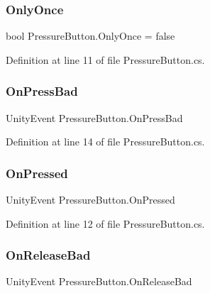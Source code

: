 \subsubsection{\texorpdfstring{Only\+Once}{OnlyOnce}}
{\footnotesize\ttfamily bool Pressure\+Button.\+Only\+Once = false}



Definition at line 11 of file Pressure\+Button.\+cs.

\mbox{\label{class_pressure_button_a39553f5399d4913445bfc8a7f36e7bb3}} 
\subsubsection{\texorpdfstring{On\+Press\+Bad}{OnPressBad}}
{\footnotesize\ttfamily Unity\+Event Pressure\+Button.\+On\+Press\+Bad}



Definition at line 14 of file Pressure\+Button.\+cs.

\mbox{\label{class_pressure_button_a75331263686a56126a5048151a05855c}} 
\subsubsection{\texorpdfstring{On\+Pressed}{OnPressed}}
{\footnotesize\ttfamily Unity\+Event Pressure\+Button.\+On\+Pressed}



Definition at line 12 of file Pressure\+Button.\+cs.

\mbox{\label{class_pressure_button_a2eeb88d6b3a61b95406ea13ece3481f4}} 
\subsubsection{\texorpdfstring{On\+Release\+Bad}{OnReleaseBad}}
{\footnotesize\ttfamily Unity\+Event Pressure\+Button.\+On\+Release\+Bad}



